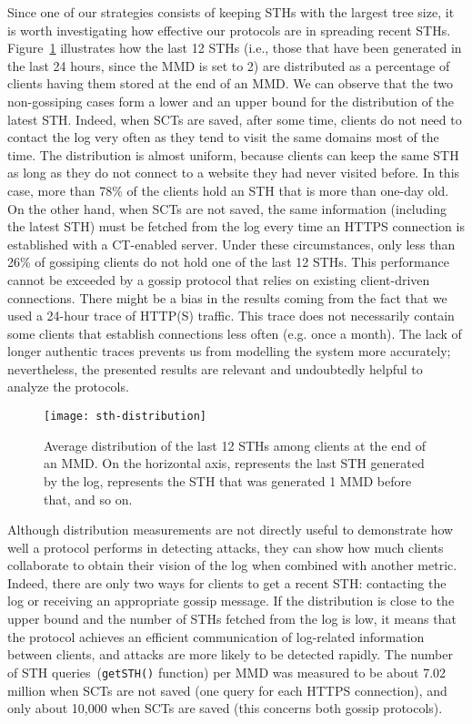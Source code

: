 Since one of our strategies consists of keeping STHs with the
largest tree size, it is worth investigating how effective our protocols are in spreading
recent STHs. Figure~\ref{fig:sth_distribution} illustrates how the last 12 STHs (i.e.,
those that have been generated in the last 24 hours, since the MMD is set to 2) are distributed
as a percentage of clients having them stored at the end of an MMD.
We can observe that the two non-gossiping cases form a lower
and an upper bound for the distribution of the latest STH. Indeed, when SCTs
are saved, after some time, clients do not need to contact the log very often as they tend
to visit the same domains most of the time. The distribution is almost
uniform, because clients can keep the same STH as long as they do not connect to a website
they had never visited before. In this case, more than 78\% of the clients hold an STH 
that is more than one-day old. On the other hand, when SCTs are not saved, the same
information (including the latest STH) must be fetched from the log every time an HTTPS
connection is established with a CT-enabled server. Under these circumstances, 
only less than 26\% of gossiping clients do not hold one of the last 12 STHs.
This performance cannot be exceeded by a gossip protocol that relies on existing
client-driven connections.
There might be a bias in the results coming from the fact that we used a 24-hour trace of
HTTP(S) traffic. This trace does not necessarily contain some clients that establish connections
less often (e.g. once a month). The lack of longer authentic traces prevents us from modelling
the system more accurately; nevertheless, the presented results are relevant and undoubtedly
helpful to analyze the protocols.

\begin{figure}
\centering
\texttt{[image: sth-distribution]}
\caption{Average distribution of the last 12 STHs among clients at the end of an
MMD.  On the horizontal axis,  represents the last STH generated by the log,
 represents the STH that was generated 1 MMD before that, and so on.}
\label{fig:sth_distribution}
\end{figure}

Although distribution measurements are not directly useful to demonstrate how well
a protocol performs in detecting attacks, they can show how much clients collaborate to obtain
their vision of the log when combined with another metric. Indeed, there are
only two ways for clients to get a recent STH: contacting the log or receiving an appropriate
gossip message. If the distribution is close to the upper bound and the number of STHs
fetched from the log is
low, it means that the protocol achieves an efficient communication of log-related information
between clients, and attacks are more likely to be detected rapidly. The number of STH
queries~(\texttt{getSTH()} function) per MMD was measured to be about 7.02 million when SCTs
are not saved (one query for each HTTPS connection), and only about 10,000 when SCTs are saved
(this concerns both gossip protocols).


